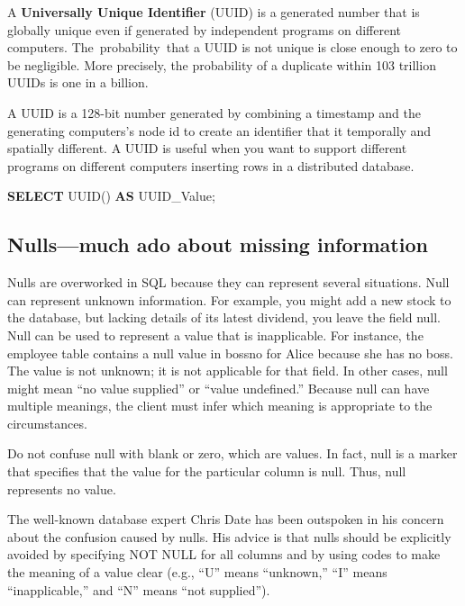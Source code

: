 \documentclass[
]{article}
\newenvironment{Shaded}{\begin{snugshade}}{\end{snugshade}}
\newcommand{\KeywordTok}[1]{\textcolor[rgb]{0.13,0.29,0.53}{\textbf{#1}}}
\newcommand{\NormalTok}[1]{#1}
\begin{document}
A \textbf{Universally Unique Identifier} (UUID) is a generated number
that is globally unique even if generated by independent programs on
different computers. The~probability~that a UUID is not unique is close
enough to zero to be negligible. More precisely, the probability of a
duplicate within 103 trillion UUIDs is one in a billion.

A UUID is a 128-bit number generated by combining a timestamp and the
generating computers's node id to create an identifier that it
temporally and spatially different. A UUID is useful when you want to
support different programs on different computers inserting rows in a
distributed database.

\begin{Shaded}
\begin{Highlighting}[]
\KeywordTok{SELECT}\NormalTok{ UUID() }\KeywordTok{AS}\NormalTok{ UUID\_Value;}
\end{Highlighting}
\end{Shaded}

\hypertarget{nullsmuch-ado-about-missing-information}{%
\subsection*{Nulls---much ado about missing
information}\label{nullsmuch-ado-about-missing-information}}

Nulls are overworked in SQL because they can represent several
situations. Null can represent unknown information. For example, you
might add a new stock to the database, but lacking details of its latest
dividend, you leave the field null. Null can be used to represent a
value that is inapplicable. For instance, the employee table contains a
null value in bossno for Alice because she has no boss. The value is not
unknown; it is not applicable for that field. In other cases, null might
mean ``no value supplied'' or ``value undefined.'' Because null can have
multiple meanings, the client must infer which meaning is appropriate to
the circumstances.

Do not confuse null with blank or zero, which are values. In fact, null
is a marker that specifies that the value for the particular column is
null. Thus, null represents no value.

The well-known database expert Chris Date has been outspoken in his
concern about the confusion caused by nulls. His advice is that nulls
should be explicitly avoided by specifying NOT NULL for all columns and
by using codes to make the meaning of a value clear (e.g., ``U'' means
``unknown,'' ``I'' means ``inapplicable,'' and ``N'' means ``not
supplied'').
\end{document}
